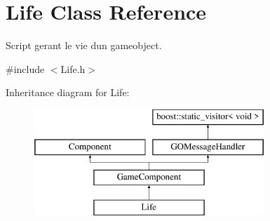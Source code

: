 \hypertarget{class_life}{}\section{Life Class Reference}
\label{class_life}


Script gerant le vie d\textquotesingle{}un gameobject.  




{\ttfamily \#include $<$Life.\+h$>$}

Inheritance diagram for Life\+:\begin{figure}[H]
\begin{center}
\leavevmode
\includegraphics[height=4.000000cm]{class_life}
\end{center}
\end{figure}
